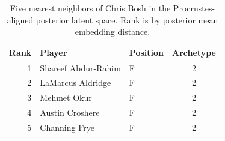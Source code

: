 \begin{table}[htbp]
  \centering\small
  \begin{tabular}{rllc}
    \toprule
    Rank & Player & Position & Archetype \\
    \midrule
    1 & Shareef Abdur-Rahim & F & 2 \\
    2 & LaMarcus Aldridge & F & 2 \\
    3 & Mehmet Okur & F & 2 \\
    4 & Austin Croshere & F & 2 \\
    5 & Channing Frye & F & 2 \\
    \bottomrule
  \end{tabular}
  \caption{Five nearest neighbors of Chris Bosh in the Procrustes-aligned posterior latent space. Rank is by posterior mean embedding distance.}
  \label{tab:Chris_Bosh_neighbors}
\end{table}

